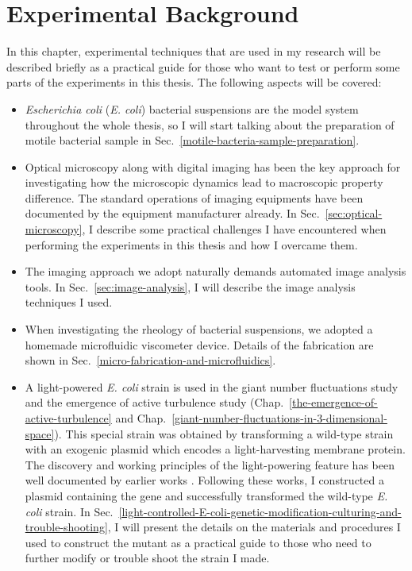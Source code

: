 \chapter{Experimental Background}
\label{experimental-background}
In this chapter, experimental techniques that are used in my research will be described briefly as a practical guide for those who want to test or perform some parts of the experiments in this thesis. The following aspects will be covered:
\begin{itemize}
\item \textit{Escherichia coli} (\textit{E. coli}) bacterial suspensions are the model system throughout the whole thesis, so I will start talking about the preparation of motile bacterial sample in Sec.~\ref{motile-bacteria-sample-preparation}.
\item Optical microscopy along with digital imaging has been the key approach for investigating how the microscopic dynamics lead to macroscopic property difference. The standard operations of imaging equipments have been documented by the equipment manufacturer already. In Sec.~\ref{sec:optical-microscopy}, I describe some practical challenges I have encountered when performing the experiments in this thesis and how I overcame them.
\item The imaging approach we adopt naturally demands automated image analysis tools. In Sec.~\ref{sec:image-analysis}, I will describe the image analysis techniques I used.
\item When investigating the rheology of bacterial suspensions, we adopted a homemade microfluidic viscometer device. Details of the fabrication are shown in Sec.~\ref{micro-fabrication-and-microfluidics}.
\item A light-powered \textit{E. coli} strain is used in the giant number fluctuations study and the emergence of active turbulence study (Chap.~\ref{the-emergence-of-active-turbulence} and Chap.~\ref{giant-number-fluctuations-in-3-dimensional-space}). This special strain was obtained by transforming a wild-type strain with an exogenic plasmid which encodes a light-harvesting membrane protein. The discovery and working principles of the light-powering feature has been well documented by earlier works \cite{Beja2000, Subramaniam2000, DelaTorre2003, Walter2007, Claassens2013}. Following these works, I constructed a plasmid containing the gene and successfully transformed the wild-type \textit{E. coli} strain. In Sec.~\ref{light-controlled-E-coli-genetic-modification-culturing-and-trouble-shooting}, I will present the details on the materials and procedures I used to construct the mutant as a practical guide to those who need to further modify or trouble shoot the strain I made.
\end{itemize}

